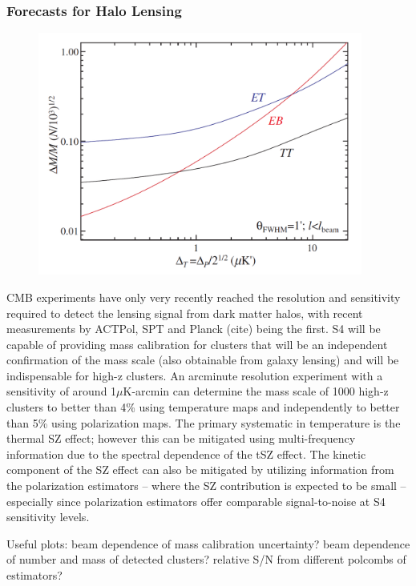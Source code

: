 \subsubsection{Forecasts for Halo Lensing}\label{haloLensForecast}

\begin{figure}[h]
\includegraphics[width=0.95\textwidth]{CMBLensing/HaloLensing.png}
\caption{}
\end{figure}

CMB experiments have only very recently reached the resolution and sensitivity required to detect the lensing signal from dark matter halos, with recent measurements by ACTPol, SPT and Planck (cite) being the first. S4 will be capable of providing mass calibration for clusters that will be an independent confirmation of the mass scale (also obtainable from galaxy lensing) and will be indispensable for high-z clusters. An arcminute resolution experiment with a sensitivity of around 1$\mu$K-arcmin can determine the mass scale of 1000 high-z clusters to better than 4\% using temperature maps and independently to better than 5\% using polarization maps. The primary systematic in temperature is the thermal SZ effect; however this can be mitigated using multi-frequency information due to the spectral dependence of the tSZ effect. The kinetic component of the SZ effect can also be mitigated by utilizing information from the polarization estimators -- where the SZ contribution is expected to be small -- especially since polarization estimators offer comparable signal-to-noise at S4 sensitivity levels.

Useful plots: beam dependence of mass calibration uncertainty? beam dependence of number and mass of detected clusters? relative S/N from different polcombs of estimators?



